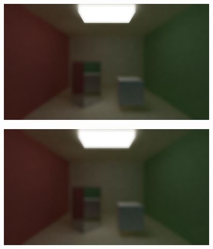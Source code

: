 \documentclass[titlepage,12pt]{report}
\begin{document}
\begin{appendices}
\begin{figure}[H]
	\centering
	\includegraphics[scale=0.5]{media/bilateral/cornell_normal_50_bilateral_filter_21_15_40.png}
	\label{ap39}
\end{figure}

\begin{figure}[H]
	\centering
	\includegraphics[scale=0.5]{media/bilateral/cornell_normal_50_bilateral_filter_21_15_60.png}
	\label{ap40}
\end{figure}


\end{appendices}
\end{document}
